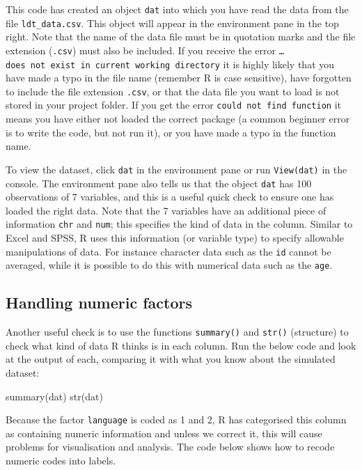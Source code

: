 \documentclass[
  english,
  doc,floatsintext]{apa6}
\newenvironment{Shaded}{\begin{snugshade}}{\end{snugshade}}
\newcommand{\FunctionTok}[1]{\textcolor[rgb]{0.00,0.00,0.00}{#1}}
\newcommand{\NormalTok}[1]{#1}
\begin{document}
This code has created an object \texttt{dat} into which you have read the data from the file \texttt{ldt\_data.csv}. This object will appear in the environment pane in the top right. Note that the name of the data file must be in quotation marks and the file extension (\texttt{.csv}) must also be included. If you receive the error \texttt{\ldots{}does\ not\ exist\ in\ current\ working\ directory} it is highly likely that you have made a typo in the file name (remember R is case sensitive), have forgotten to include the file extension \texttt{.csv}, or that the data file you want to load is not stored in your project folder. If you get the error \texttt{could\ not\ find\ function} it means you have either not loaded the correct package (a common beginner error is to write the code, but not run it), or you have made a typo in the function name.

To view the dataset, click \texttt{dat} in the environment pane or run \texttt{View(dat)} in the console. The environment pane also tells us that the object \texttt{dat} has 100 observations of 7 variables, and this is a useful quick check to ensure one has loaded the right data. Note that the 7 variables have an additional piece of information \texttt{chr} and \texttt{num}; this specifies the kind of data in the column. Similar to Excel and SPSS, R uses this information (or variable type) to specify allowable manipulations of data. For instance character data such as the \texttt{id} cannot be averaged, while it is possible to do this with numerical data such as the \texttt{age}.

\hypertarget{handling-numeric-factors}{%
\subsection{Handling numeric factors}\label{handling-numeric-factors}}

Another useful check is to use the functions \texttt{summary()} and \texttt{str()} (structure) to check what kind of data R thinks is in each column. Run the below code and look at the output of each, comparing it with what you know about the simulated dataset:

\begin{Shaded}
\begin{Highlighting}[]
\FunctionTok{summary}\NormalTok{(dat)}
\FunctionTok{str}\NormalTok{(dat)        }
\end{Highlighting}
\end{Shaded}

Because the factor \texttt{language} is coded as 1 and 2, R has categorised this column as containing numeric information and unless we correct it, this will cause problems for visualisation and analysis. The code below shows how to recode numeric codes into labels.
\end{document}

